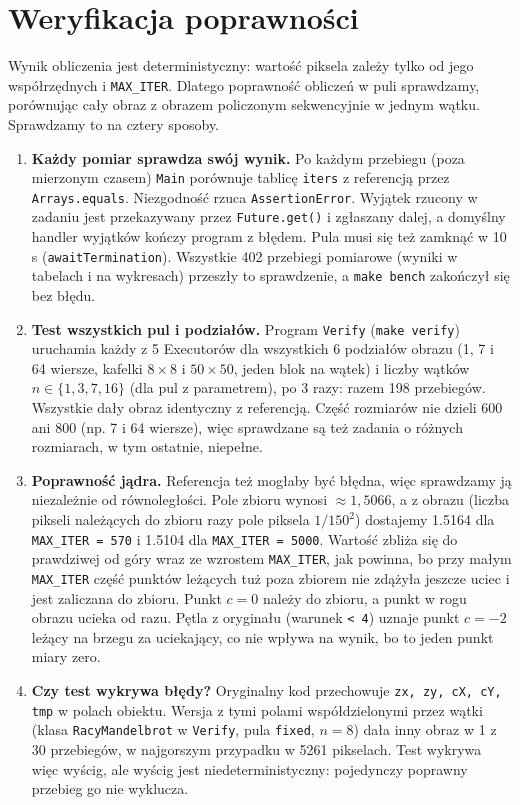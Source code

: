 \documentclass[11pt,a4paper]{article}
\begin{document}
\section{Weryfikacja poprawności}
Wynik obliczenia jest deterministyczny: wartość piksela zależy tylko od jego współrzędnych i \texttt{MAX\_ITER}.
Dlatego poprawność obliczeń w puli sprawdzamy, porównując cały obraz z obrazem policzonym sekwencyjnie w jednym wątku.
Sprawdzamy to na cztery sposoby.
\begin{enumerate}
    \item \textbf{Każdy pomiar sprawdza swój wynik.} Po każdym przebiegu (poza mierzonym czasem) \texttt{Main}
          porównuje tablicę \texttt{iters} z referencją przez \texttt{Arrays.equals}. Niezgodność rzuca \texttt{AssertionError}.
          Wyjątek rzucony w zadaniu jest przekazywany przez \texttt{Future.get()} i zgłaszany dalej,
          a domyślny handler wyjątków kończy program z błędem. Pula musi się też zamknąć w 10 s
          (\texttt{awaitTermination}). Wszystkie \num{402} przebiegi pomiarowe (wyniki w tabelach i na wykresach)
          przeszły to sprawdzenie, a \texttt{make bench} zakończył się bez błędu.
    \item \textbf{Test wszystkich pul i podziałów.} Program \texttt{Verify} (\texttt{make verify}) uruchamia każdy z 5 Executorów dla
          wszystkich 6 podziałów obrazu (1, 7 i 64 wiersze, kafelki $8 \times 8$ i $50 \times 50$, jeden blok na wątek)
          i liczby wątków $n \in \{1, 3, 7, 16\}$ (dla pul z parametrem), po 3 razy: razem \num{198} przebiegów.
          Wszystkie dały obraz identyczny z referencją. Część rozmiarów nie dzieli 600 ani 800 (np. 7 i 64 wiersze), więc sprawdzane są
          też zadania o różnych rozmiarach, w tym ostatnie, niepełne.
    \item \textbf{Poprawność jądra.} Referencja też mogłaby być błędna, więc sprawdzamy ją niezależnie od równoległości.
          Pole zbioru wynosi $\approx 1{,}5066$, a z obrazu (liczba pikseli należących do zbioru razy pole piksela $1/150^2$)
          dostajemy \num{1.5164} dla \texttt{MAX\_ITER = 570} i \num{1.5104} dla \texttt{MAX\_ITER = 5000}.
          Wartość zbliża się do prawdziwej od góry wraz ze wzrostem \texttt{MAX\_ITER}, jak powinna, bo przy małym \texttt{MAX\_ITER}
          część punktów leżących tuż poza zbiorem nie zdążyła jeszcze uciec i jest zaliczana do zbioru. Punkt $c = 0$ należy do zbioru, a punkt w rogu obrazu ucieka od razu.
          Pętla z oryginału (warunek \texttt{< 4}) uznaje punkt $c = -2$ leżący na brzegu za uciekający,
          co nie wpływa na wynik, bo to jeden punkt miary zero.
    \item \textbf{Czy test wykrywa błędy?} Oryginalny kod przechowuje \texttt{zx, zy, cX, cY, tmp} w polach obiektu.
          Wersja z tymi polami współdzielonymi przez wątki (klasa \texttt{RacyMandelbrot} w \texttt{Verify}, pula \texttt{fixed}, $n = 8$)
          dała inny obraz w \num{1} z \num{30} przebiegów, w najgorszym przypadku w \num{5261} pikselach.
          Test wykrywa więc wyścig, ale wyścig jest niedeterministyczny: pojedynczy poprawny przebieg go nie wyklucza.
\end{enumerate}
\end{document}
